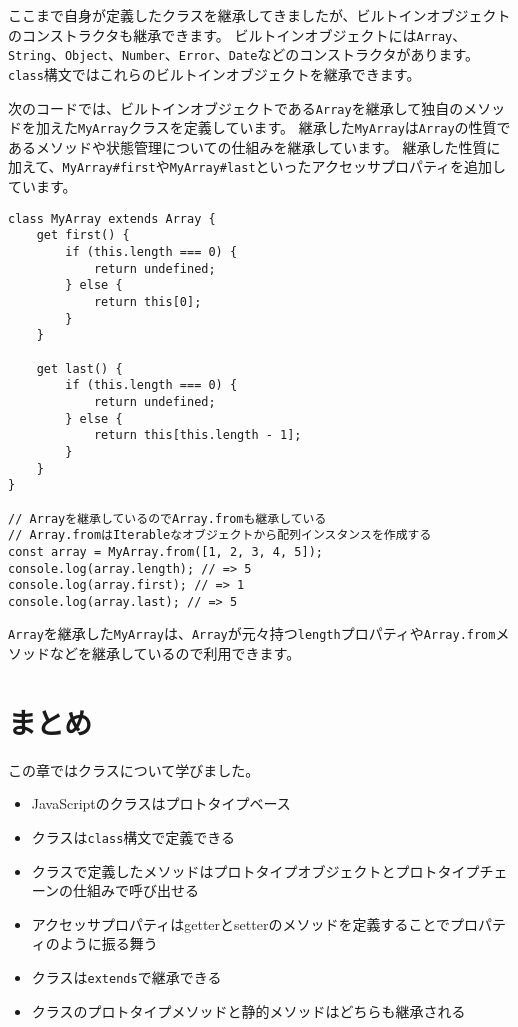 ここまで自身が定義したクラスを継承してきましたが、ビルトインオブジェクトのコンストラクタも継承できます。
ビルトインオブジェクトには\texttt{Array}、\texttt{String}、\texttt{Object}、\texttt{Number}、\texttt{Error}、\texttt{Date}などのコンストラクタがあります。
\texttt{class}構文ではこれらのビルトインオブジェクトを継承できます。

次のコードでは、ビルトインオブジェクトである\texttt{Array}を継承して独自のメソッドを加えた\texttt{MyArray}クラスを定義しています。
継承した\texttt{MyArray}は\texttt{Array}の性質であるメソッドや状態管理についての仕組みを継承しています。
継承した性質に加えて、\texttt{MyArray\#first}や\texttt{MyArray\#last}といったアクセッサプロパティを追加しています。

\begin{lstlisting}
class MyArray extends Array {
    get first() {
        if (this.length === 0) {
            return undefined;
        } else {
            return this[0];
        }
    }

    get last() {
        if (this.length === 0) {
            return undefined;
        } else {
            return this[this.length - 1];
        }
    }
}

// Arrayを継承しているのでArray.fromも継承している
// Array.fromはIterableなオブジェクトから配列インスタンスを作成する
const array = MyArray.from([1, 2, 3, 4, 5]);
console.log(array.length); // => 5
console.log(array.first); // => 1
console.log(array.last); // => 5
\end{lstlisting}

\texttt{Array}を継承した\texttt{MyArray}は、\texttt{Array}が元々持つ\texttt{length}プロパティや\texttt{Array.from}メソッドなどを継承しているので利用できます。

\hypertarget{conclusion}{%
\section{まとめ}\label{conclusion}}

この章ではクラスについて学びました。

\begin{itemize}
\item
  JavaScriptのクラスはプロトタイプベース
\item
  クラスは\texttt{class}構文で定義できる
\item
  クラスで定義したメソッドはプロトタイプオブジェクトとプロトタイプチェーンの仕組みで呼び出せる
\item
  アクセッサプロパティはgetterとsetterのメソッドを定義することでプロパティのように振る舞う
\item
  クラスは\texttt{extends}で継承できる
\item
  クラスのプロトタイプメソッドと静的メソッドはどちらも継承される
\end{itemize}
